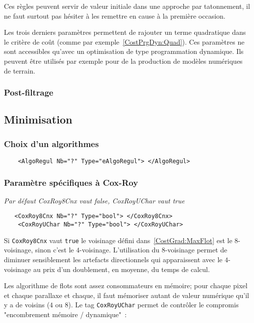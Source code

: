 Ces r\`egles peuvent servir de valeur initiale dans une approche par
tatonnement, il ne faut surtout pas h\'esiter \`a les remettre en cause
\`a la premi\`ere occasion.

Les trois derniers param\`etres permettent de rajouter un terme
quadratique dans le crit\`ere de co\^ut (comme par 
exemple~\ref{CostPrgDyn:Quad}). Ces param\`etres ne sont accessibles
qu'avec un optimisation de type programmation dynamique.
Ils peuvent \^etre utilis\'es par exemple pour de la production
de mod\`eles num\'eriques de terrain.

\subsubsection{Post-filtrage}

\subsection{Minimisation}

\subsubsection{Choix d'un algorithmes}

\begin{verbatim}
    <AlgoRegul Nb="?" Type="eAlgoRegul"> </AlgoRegul>
\end{verbatim}


\subsubsection{Param\`etre sp\'ecifiques \`a Cox-Roy}

\emph{Par d\'efaut CoxRoy8Cnx vaut false, CoxRoyUChar vaut true}

\begin{verbatim}
   <CoxRoy8Cnx Nb="?" Type="bool"> </CoxRoy8Cnx>
    <CoxRoyUChar Nb="?" Type="bool"> </CoxRoyUChar>
\end{verbatim}


Si {\tt CoxRoy8Cnx} vaut {\tt true} le voisinage d\'efini 
dans~\ref{CostGrad:MaxFlot} est le $8$-voisinage, sinon c'est
le $4$-voisinage.  L'utilisation du  $8$-voisinage permet
de diminuer sensiblement les artefacts directionnels qui
apparaissent avec le  $4$-voisinage au prix d'un doublement,
en moyenne, du temps de calcul.

Les algorithme de flots sont assez consommateurs en m\'emoire;
pour chaque pixel et chaque parallaxe et chaque, il faut m\'emoriser
autant de valeur num\'erique qu'il y a de voisins ($4$ ou $8$).
Le tag {\tt CoxRoyUChar} permet de contr\^oler le compromis "encombrement
m\'emoire / dynamique"~:

